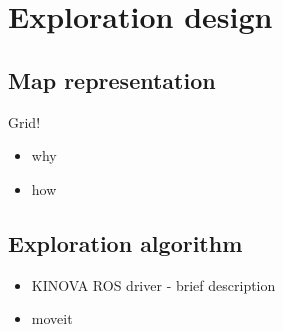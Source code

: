 \documentclass[buriama8_dp.tex]{subfiles}
\begin{document}
\chapter{Exploration design}

\section{Map representation}
Grid!
\begin{itemize}
\item why
\item how
\end{itemize}

\section{Exploration algorithm}

\begin{itemize}
\item KINOVA ROS driver - brief description
\item moveit
\end{itemize}
\end{document}
